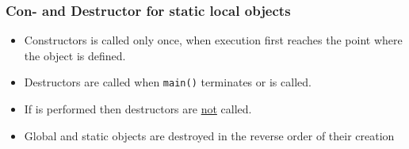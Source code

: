 \subsubsection{Con- and Destructor for static local objects}
\begin{itemize}
    \item Constructors is called only once, when execution first reaches the point where the object is defined.
    \item Destructors are called when \texttt{main()} terminates or  is called.
    \item If  is performed then destructors are \underline{not} called.
    \item Global and static objects are destroyed in the reverse order of their creation
\end{itemize}

